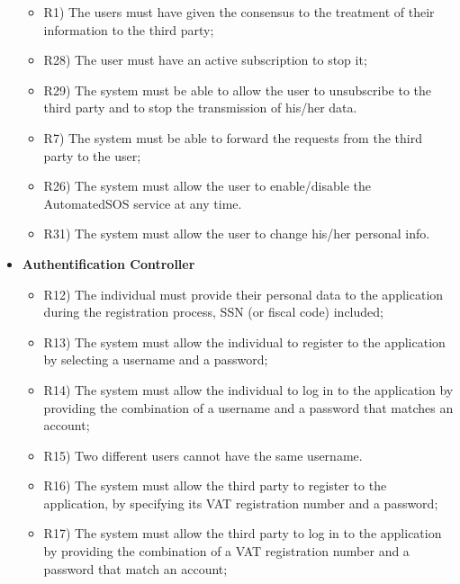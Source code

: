 \begin{itemize}
		\begin{itemize}
			\item R1) The users must have given the consensus to the treatment of their information to the third party;\\
			\item R28) The user must have an active subscription to stop it;\\
	 		\item R29) The system must be able to allow the user to unsubscribe to the third party and to stop the transmission of his/her data.\\
	 		\item R7) The system must be able to forward the requests from the third party to the user;\\
	 		\item R26) The system must allow the user to enable/disable the AutomatedSOS service at any time.\\
			\item R31) The system must allow the user to change his/her personal info.\\
		\end{itemize}
		\item \textbf{Authentification Controller}
		\begin{itemize}
			\item R12) The individual must provide their personal data to the application during the registration process, SSN (or fiscal code) included;\\
			\item R13) The system must allow the individual to register to the application by selecting a username and a password;\\
			\item R14) The system must allow the individual to log in to the application by providing the combination of a username and a password that matches an account;\\
			\item R15) Two different users cannot have the same username.\\
			\item R16) The system must allow the third party to register to the application, by specifying its VAT registration number and a password;\\
			\item R17) The system must allow the third party to log in to the application by providing the combination of a VAT registration number and a password that match an account;\\

\end{itemize}
\end{itemize}
